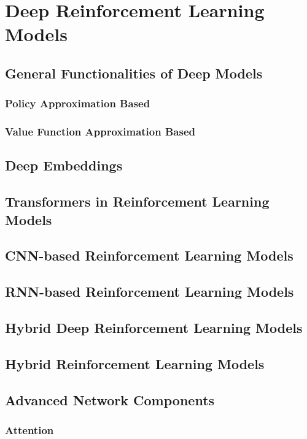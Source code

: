 %
%
%
\chapter{Deep Reinforcement Learning Models}
\label{intro} %
\section{General Functionalities of Deep Models}
\subsection{Policy Approximation Based}
\subsection{Value Function Approximation Based}

\section{Deep Embeddings}

\section{Transformers in Reinforcement Learning Models}

\section{CNN-based Reinforcement Learning Models}

\section{RNN-based Reinforcement Learning Models}

\section{Hybrid Deep Reinforcement Learning Models}

\section{Hybrid Reinforcement Learning Models}

\section{Advanced Network Components}
\subsection{Attention}


